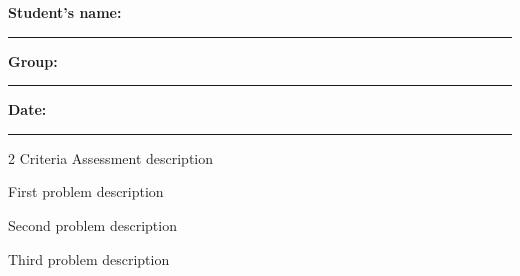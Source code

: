 	\vspace{0.1cm}
	
	\noindent
	\textbf{Student's name:} \rule{7cm}{0.4pt}\hfill
	\textbf{Group:} \rule{2cm}{0.4pt}\hfill
	\textbf{Date:} \rule{3cm}{0.4pt}
	
	\begin{multicols}{2}
		\vspace{-0.25cm}
		Criteria Assessment description
		
		\vspace{0.25cm}
		\vspace{-0.25cm}
		First problem description
		
		\vspace{0.25cm}
		\vspace{-0.25cm}
		Second problem description
		
		\vspace{0.25cm}
		\vspace{-0.25cm}
		Third problem description
	\end{multicols}
	

